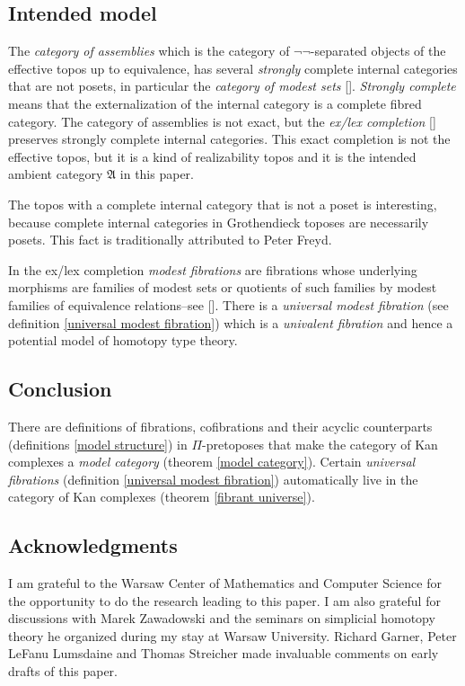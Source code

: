 \documentclass{tac}
\newcommand\citep[1]{[\cite{#1}]}
\newcommand\ambient{\mathfrak A}
\begin{document}
\subsection*{Intended model} The \emph{category of assemblies} which is the category of $\neg\neg$-separated objects of the effective topos up to equivalence, has several \emph{strongly} complete internal categories that are not posets, in particular the \emph{category of modest sets} \citep{MR1097022,MR2479466,MR1023803}. \emph{Strongly complete} means that the externalization of the internal category is a complete fibred category. The category of assemblies is not exact, but the \emph{ex/lex completion} \citep{MR1600009} preserves strongly complete internal categories. This exact completion is not the effective topos, but it is a kind of realizability topos and it is the intended ambient category $\ambient$ in this paper. 

The topos with a complete internal category that is not a poset is interesting, because complete internal categories in Grothendieck toposes are necessarily posets. This fact is traditionally attributed to Peter Freyd.

In the ex/lex completion \emph{modest fibrations} are fibrations whose underlying morphisms are families of modest sets or quotients of such families by modest families of equivalence relations--see \citep{MR1097022,MR1023803,MR2479466}. There is a \emph{universal modest fibration} (see definition \ref{universal modest fibration}) which is a \emph{univalent fibration} and hence a potential model of homotopy type theory.

\subsection*{Conclusion} There are definitions of fibrations, cofibrations and their acyclic counterparts (definitions \ref{model structure}) in $\Pi$-pretoposes that make the category of Kan complexes a \emph{model category} (theorem \ref{model category}). Certain \emph{universal fibrations} (definition \ref{universal modest fibration}) automatically live in the category of Kan complexes (theorem \ref{fibrant universe}).

\subsection*{Acknowledgments} 
I am grateful to the Warsaw Center of Mathematics and Computer Science for the opportunity to do the research leading to this paper. I am also grateful for discussions with Marek Zawadowski and the seminars on simplicial homotopy theory he organized during my stay at Warsaw University. Richard Garner, Peter LeFanu Lumsdaine and Thomas Streicher made invaluable comments on early drafts of this paper.














\printbibliography
\end{document}
